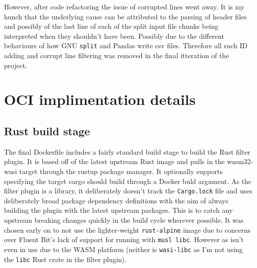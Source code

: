 However, after code refactoring the issue of corrupted lines went away. It is my hunch that the underlying cause can be attributed to the parsing of header files and possibly of the last line of each of the split input file chunks being interpreted when they shouldn't have been. Possibly due to the different behaviours of how GNU \texttt{split} and Pandas write \acrshort{csv} files. Therefore all such ID adding and corrupt line filtering was removed in the final itteration of the project. 

\section{OCI implimentation details}
\subsection{Rust build stage}
The final Dockerfile includes a fairly standard build stage to build the Rust filter plugin. It is based off of the latest upstream Rust image and pulls in the wasm32-wasi target through the rustup package manager. It optionally supports specifying the target cargo should build through a Docker buld argument. As the filter plugin is a library, it deliberately doesn't track the \texttt{Cargo.lock} file and uses deliberately broad package dependency definitions with the aim of always building the plugin with the latest upstream packages. This is to catch any upstream breaking changes quickly in the build cycle wherever possible. It was chosen early on to not use the lighter-weight \texttt{rust-alpine} image due to concerns over Fluent Bit's lack of support for running with \texttt{musl libc}. However as  isn't even in use due to the WASM platform (neither is \texttt{wasi-libc} as I'm not using the \texttt{libc} Rust crate in the filter plugin).

